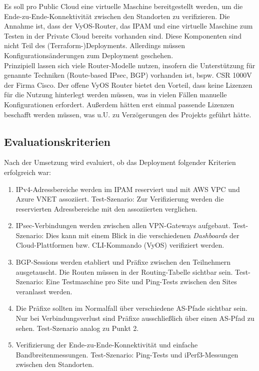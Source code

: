 Es soll pro Public Cloud eine virtuelle Maschine bereitgestellt werden, um die Ende-zu-Ende-Konnektivität zwischen den Standorten zu verifizieren.
Die Annahme ist, dass der VyOS-Router, das IPAM und eine virtuelle Maschine zum Testen in der Private Cloud bereits vorhanden sind. Diese Komponenten sind nicht Teil des (Terraform-)Deployments. Allerdings müssen Konfigurationsänderungen zum \gls{Deployment} geschehen.\\
Prinzipiell lassen sich viele Router-Modelle nutzen, insofern die Unterstützung für genannte Techniken (Route-based IPsec, BGP) vorhanden ist, bspw. CSR 1000V der Firma Cisco\cite{Durai2016}. Der offene VyOS Router bietet den Vorteil, dass keine Lizenzen für die Nutzung hinterlegt werden müssen, was in vielen Fällen manuelle Konfigurationen erfordert. Außerdem hätten erst einmal passende Lizenzen beschafft werden müssen, was u.U. zu Verzögerungen des Projekts geführt hätte.





\subsection{Evaluationskriterien}\label{eval-kriterien-uc1}
Nach der Umsetzung wird evaluiert, ob das \gls{Deployment} folgender Kriterien erfolgreich war:
\begin{enumerate}
    \item IPv4-Adressbereiche werden im IPAM reserviert und mit AWS VPC und Azure VNET assoziiert. Test-Szenario: Zur Verifizierung werden die reservierten Adressbereiche mit den assoziierten verglichen.
    \item IPsec-Verbindungen werden zwischen allen VPN-Gateways aufgebaut. Test-Szenario: Dies kann mit einem Blick in die verschiedenen \textit{Dashboards} der Cloud-Plattformen bzw. CLI-Kommando (VyOS) verifiziert werden.
    \item BGP-Sessions werden etabliert und Präfixe zwischen den Teilnehmern ausgetauscht. Die Routen müssen in der Routing-Tabelle sichtbar sein. Test-Szenario: Eine Testmaschine pro Site und Ping-Tests zwischen den Sites veranlasst werden.
    \item Die Präfixe sollten im Normalfall über verschiedene AS-Pfade sichtbar sein. Nur bei Verbindungsverlust sind Präfixe ausschließlich über einen AS-Pfad zu sehen. Test-Szenario analog zu Punkt 2.
    \item Verifizierung der Ende-zu-Ende-Konnektivität und einfache Bandbreitenmessungen. Test-Szenario: Ping-Tests und iPerf3-Messungen zwischen den Standorten.
\end{enumerate}
